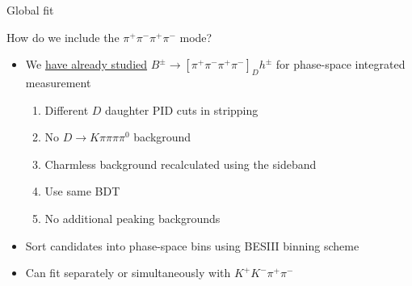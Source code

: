 \documentclass{beamer}
\begin{document}
\begin{frame}{Global fit}
  \begin{center}
    {\large How do we include the $\pi^+\pi^-\pi^+\pi^-$ mode?}
  \end{center}
  \begin{itemize}
    \setlength\itemsep{1.5em}
    \item{We \underline{have already studied} $B^\pm\to[\pi^+\pi^-\pi^+\pi^-]_Dh^\pm$ for phase-space integrated measurement}
    \begin{enumerate}
      \setlength\itemsep{0.5em}
      \item{Different $D$ daughter PID cuts in stripping}
      \item{No $D\to K\pi\pi\pi\pi^0$ background}
      \item{Charmless background recalculated using the sideband}
      \item{Use same BDT}
      \item{No additional peaking backgrounds}
    \end{enumerate}
    \item{Sort candidates into phase-space bins using BESIII binning scheme}
    \item{Can fit separately or simultaneously with $K^+K^-\pi^+\pi^-$}
  \end{itemize}
\end{frame}
\end{document}
